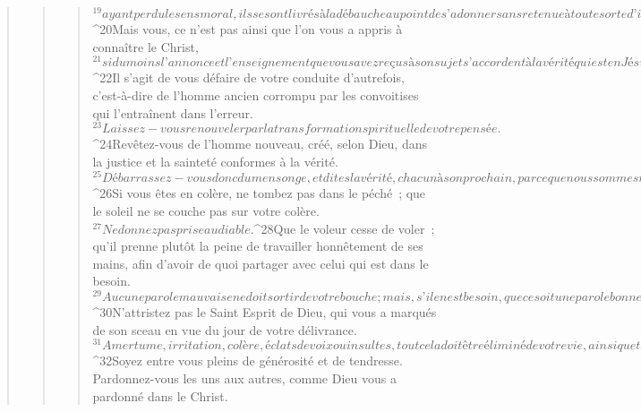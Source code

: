 \begin{verse}
\begin{verse}
\begin{verse}
${}^{19}ayant perdu le sens moral, ils se sont livrés à la débauche au point de s’adonner sans retenue à toute sorte d’impureté.
${}^{20}Mais vous, ce n’est pas ainsi que l’on vous a appris à connaître le Christ, 
${}^{21}si du moins l’annonce et l’enseignement que vous avez reçus à son sujet s’accordent à la vérité qui est en Jésus. 
${}^{22}Il s’agit de vous défaire de votre conduite d’autrefois, c’est-à-dire de l’homme ancien corrompu par les convoitises qui l’entraînent dans l’erreur. 
${}^{23}Laissez-vous renouveler par la transformation spirituelle de votre pensée. 
${}^{24}Revêtez-vous de l’homme nouveau, créé, selon Dieu, dans la justice et la sainteté conformes à la vérité.
${}^{25}Débarrassez-vous donc du mensonge, et dites la vérité, chacun à son prochain, parce que nous sommes membres les uns des autres. 
${}^{26}Si vous êtes en colère, ne tombez pas dans le péché ; que le soleil ne se couche pas sur votre colère. 
${}^{27}Ne donnez pas prise au diable. 
${}^{28}Que le voleur cesse de voler ; qu’il prenne plutôt la peine de travailler honnêtement de ses mains, afin d’avoir de quoi partager avec celui qui est dans le besoin. 
${}^{29}Aucune parole mauvaise ne doit sortir de votre bouche ; mais, s’il en est besoin, que ce soit une parole bonne et constructive, profitable à ceux qui vous écoutent. 
${}^{30}N’attristez pas le Saint Esprit de Dieu, qui vous a marqués de son sceau en vue du jour de votre délivrance. 
${}^{31}Amertume, irritation, colère, éclats de voix ou insultes, tout cela doit être éliminé de votre vie, ainsi que toute espèce de méchanceté. 
${}^{32}Soyez entre vous pleins de générosité et de tendresse. Pardonnez-vous les uns aux autres, comme Dieu vous a pardonné dans le Christ.
      

\end{verse}
\end{verse}
\end{verse}
